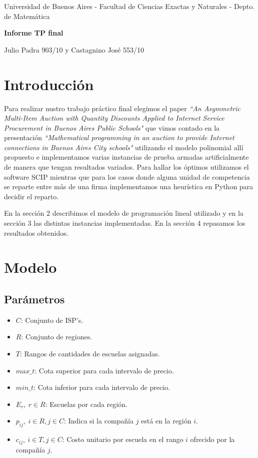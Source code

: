 \documentclass[12pt]{article}
\begin{document}
 \centerline{{\small Universidad de Buenos Aires - Facultad de Ciencias Exactas y Naturales - Depto. de Matem\'atica}}
 
 \vskip 0.2cm
 \hrulefill
 \vskip 0.2cm

 \centerline{{\bf\Huge {\sc Informe TP final}}}
 \vskip 0.2cm
 \centerline{\ttfamily Julio Padra 903/10 y Castagnino Jos\'e 553/10}
 \hrulefill


 \bigskip
 
 
\begin{center}
  \hrulefill

 \end{center}
\section{Introducción}
Para realizar nustro trabajo práctico final elegimos el paper \textit{``An Asymmetric Multi-Item Auction with Quantity Discounts Applied to Internet Service Procurement in Buenos Aires Public Schools"} que vimos contado en la presentación \textit{``Mathematical programming in an auction to provide Internet connections in Buenos Aires City schools"} utilizando el modelo polinomial allí propuesto e implementamos varias instancias de prueba armadas artificialmente de manera que tengan resultados variados. Para hallar los óptimos utilizamos el software SCIP mientras que para los casos donde alguna unidad de competencia se reparte entre más de una firma implementamos una heurística en Python para decidir el reparto. 

\bigskip
En la sección 2 describimos el modelo de programación lineal utilizado y en la sección 3 las distintas instancias implementadas. En la sección 4 repasamos los resultados obtenidos.

\bigskip
\section{Modelo}

\subsection{Parámetros}
\begin{itemize}
    \item $C$: Conjunto de ISP's.
    \item $R$: Conjunto de regiones.
    \item $T$: Rangos de cantidades de escuelas asignadas.
    \item $max\_t$: Cota superior para cada intervalo de precio.
    \item $min\_t$: Cota inferior para cada intervalo de precio.
    \item $E_r, \ r \in R$: Escuelas por cada región.
    \item $p_{ij}, \ i \in R, j \in C$: Indica si la compañía $j$ está en la región $i$.
    \item $c_{ij}, \ i \in T, j \in C$: Costo unitario por escuela en el rango $i$ ofrecido por la compañía $j$.
\end{itemize}
\end{document}
